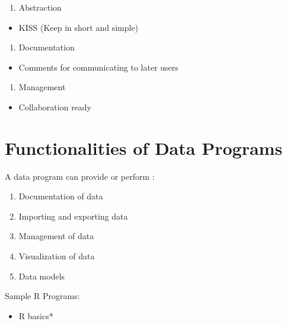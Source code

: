 \documentclass[]{book}
\providecommand{\tightlist}{%
  \setlength{\itemsep}{0pt}\setlength{\parskip}{0pt}}
\begin{document}
\begin{enumerate}
\def\labelenumi{\arabic{enumi}.}
\setcounter{enumi}{4}
\tightlist
\item
  Abstraction
\end{enumerate}

\begin{itemize}
\tightlist
\item
  KISS (Keep in short and simple)
\end{itemize}

\begin{enumerate}
\def\labelenumi{\arabic{enumi}.}
\setcounter{enumi}{5}
\tightlist
\item
  Documentation
\end{enumerate}

\begin{itemize}
\tightlist
\item
  Comments for communicating to later users
\end{itemize}

\begin{enumerate}
\def\labelenumi{\arabic{enumi}.}
\setcounter{enumi}{6}
\tightlist
\item
  Management
\end{enumerate}

\begin{itemize}
\tightlist
\item
  Collaboration ready
\end{itemize}

\hypertarget{functionalities-of-data-programs}{%
\section{Functionalities of Data Programs}\label{functionalities-of-data-programs}}

A data program can provide or perform :

\begin{enumerate}
\def\labelenumi{\arabic{enumi}.}
\tightlist
\item
  Documentation of data
\item
  Importing and exporting data
\item
  Management of data
\item
  Visualization of data
\item
  Data models
\end{enumerate}

Sample R Programs:

\begin{itemize}
\tightlist
\item
  R basics*
\end{itemize}
\end{document}

